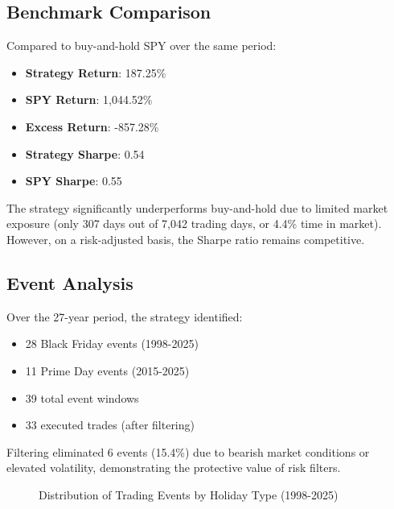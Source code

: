 \documentclass[twocolumn,ieee]{arithmaxresearch}
\begin{document}
\subsection{Benchmark Comparison}

Compared to buy-and-hold SPY over the same period:

\begin{itemize}
    \item \textbf{Strategy Return}: 187.25\%
    \item \textbf{SPY Return}: 1,044.52\%
    \item \textbf{Excess Return}: -857.28\%
    \item \textbf{Strategy Sharpe}: 0.54
    \item \textbf{SPY Sharpe}: 0.55
\end{itemize}

The strategy significantly underperforms buy-and-hold due to limited market exposure (only 307 days out of 7,042 trading days, or 4.4\% time in market). However, on a risk-adjusted basis, the Sharpe ratio remains competitive.

\subsection{Event Analysis}

Over the 27-year period, the strategy identified:

\begin{itemize}
    \item 28 Black Friday events (1998-2025)
    \item 11 Prime Day events (2015-2025)
    \item 39 total event windows
    \item 33 executed trades (after filtering)
\end{itemize}

Filtering eliminated 6 events (15.4\%) due to bearish market conditions or elevated volatility, demonstrating the protective value of risk filters.

\begin{figure}[!b]
\centering
{}
\caption{Distribution of Trading Events by Holiday Type (1998-2025)}
\label{fig:events}
\end{figure}
\end{document}
